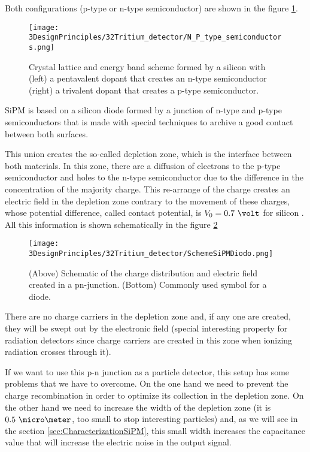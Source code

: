 Both configurations (p-type or n-type semiconductor) are shown in the figure \ref{fig:NPType_SC}.

\begin{figure}[htbp]
\centering
\texttt{[image: 3DesignPrinciples/32Tritium\_detector/N\_P\_type\_semiconductors.png]}
\caption{Crystal lattice and energy band scheme formed by a silicon with (left) a pentavalent dopant that creates an n-type semiconductor (right) a trivalent dopant that creates a p-type semiconductor. \label{fig:NPType_SC}~\cite{Leo}}
\end{figure}

SiPM is based on a silicon diode formed by a junction of n-type and p-type semiconductors that is made with special techniques to archive a good contact between both surfaces.

This union creates the so-called depletion zone, which is the interface between both materials. In this zone, there are a diffusion of electrons to the p-type semiconductor and holes to the n-type semiconductor due to the difference in the concentration of the majority charge. This re-arrange of the charge creates an electric field in the depletion zone contrary to the movement of these charges, whose potential difference, called contact potential, is $V_0 = 0.7~\volt$ for silicon \cite{Leo}. All this information is shown schematically in the figure \ref{fig:DiodeScheme}

\begin{figure}[htbp]
\centering
\texttt{[image: 3DesignPrinciples/32Tritium\_detector/SchemeSiPMDiodo.png]}
\caption{(Above) Schematic of the charge distribution and electric field created in a pn-junction. (Bottom) Commonly used symbol for a diode.\label{fig:DiodeScheme}~\cite{TesisNEXTSiPMs}}
\end{figure}

There are no charge carriers in the depletion zone and, if any one are created, they will be swept out by the electronic field (special interesting property for radiation detectors since charge carriers are created in this zone when ionizing radiation crosses through it).

If we want to use this p-n junction as a particle detector, this setup has some problems that we have to overcome. On the one hand we need to prevent the charge recombination in order to optimize its collection in the depletion zone. On the other hand we need to increase the width of the depletion zone (it is $0.5~\micro\meter$, too small to stop interesting particles) and, as we will see in the section \ref{sec:CharacterizationSiPM}, this small width increases the capacitance value that will increase the electric noise in the output signal.


